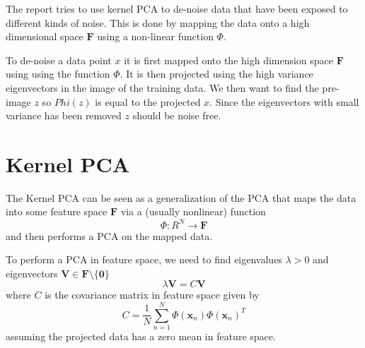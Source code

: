 \documentclass[12pt]{article}
\newcommand{\F}{\mathbf{F}}
\newcommand{\V}{\mathbf{V}}
\newcommand{\x}{\mathbf{x}}
\begin{document}
The report tries to use kernel PCA to de-noise data that have been exposed to
different kinds of noise. This is done by mapping the data onto a high
dimensional space $\F$ using a non-linear function $\Phi$.

To de-noise a data point $x$ it is first mapped onto the high dimension space
$\F$ using using the function $\Phi$. It is then projected using the
high variance eigenvectors in the image of the training data.
We then want to find the pre-image $z$ so $Phi(z)$ is equal to the
projected $x$. Since the eigenvectors with small variance has been
removed $z$ should be noise free.


\section{Kernel PCA}
The Kernel PCA can be seen as a generalization of the PCA that maps the data
into some feature space $\mathbf{F}$ via a (usually nonlinear) function
$$\Phi:R^N \to \F$$ and then performs a PCA on the mapped data.

To perform a PCA in feature space, we need to find eigenvalues $\lambda > 0$
and eigenvectors $\mathbf{V} \in \mathbf{F\setminus\{0\}}$
\begin{equation}
    \lambda\V = C\V
\end{equation}
where $C$ is the covariance matrix in feature space given by
\begin{equation}
    C = \frac{1}{N}\sum_{n=1}^{N}\Phi(\x_n)\Phi(\x_n)^T \label{eq:base_eq}
\end{equation}
assuming the projected data has a zero mean in feature space. 
\end{document}
